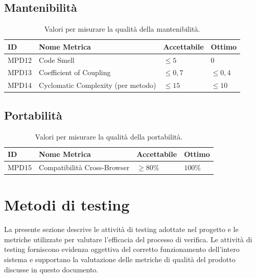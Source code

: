 \documentclass[a4paper,12pt]{article}
\begin{document}
\subsection{Mantenibilità}
\begin{table}[H]
    \centering
    \renewcommand{\arraystretch}{1.2}
    \begin{tabularx}{\textwidth}{|p{2.4cm}|X|p{3cm}|p{3cm}|}
        \hline
        \rowcolor{gray!20}
        \textbf{ID} & \textbf{Nome Metrica} & \textbf{Accettabile} & \textbf{Ottimo} \\
        \hline
        MPD12 & Code Smell & $\leq 5$ & $0$ \\
        MPD13 & Coefficient of Coupling & $\leq 0{,}7$ & $\leq 0{,}4$ \\
        MPD14 & Cyclomatic Complexity (per metodo) & $\leq 15$ & $\leq 10$ \\
        \hline
    \end{tabularx}
    \caption{Valori per misurare la qualità della mantenibilità.}
\end{table}

\subsection{Portabilità}
\begin{table}[H]
    \centering
    \renewcommand{\arraystretch}{1.2}
    \begin{tabularx}{\textwidth}{|p{2.4cm}|X|p{3cm}|p{3cm}|}
        \hline
        \rowcolor{gray!20}
        \textbf{ID} & \textbf{Nome Metrica} & \textbf{Accettabile} & \textbf{Ottimo} \\
        \hline
        MPD15 & Compatibilità Cross-Browser & $\geq 80\%$ & $100\%$ \\
        \hline
    \end{tabularx}
    \caption{Valori per misurare la qualità della portabilità.}
\end{table}

\section{Metodi di testing}
La presente sezione descrive le attività di testing adottate nel progetto e le metriche utilizzate per valutare l'efficacia del processo di verifica.
Le attività di testing forniscono evidenza oggettiva del corretto funzionamento dell'intero sistema e supportano la valutazione delle metriche di qualità del prodotto discusse in questo documento.
\end{document}
